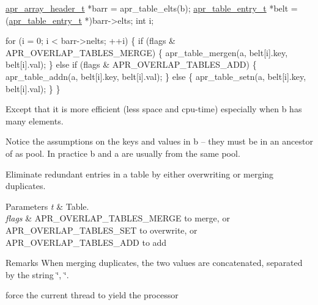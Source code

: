 \begin{DoxyPre}
 \hyperlink{structapr__array__header__t}{apr\_array\_header\_t} *barr = apr\_table\_elts(b);
 \hyperlink{structapr__table__entry__t}{apr\_table\_entry\_t} *belt = (\hyperlink{structapr__table__entry__t}{apr\_table\_entry\_t} *)barr->elts;
 int i;\end{DoxyPre}



\begin{DoxyPre} for (i = 0; i < barr->nelts; ++i) \{
     if (flags \& APR\_OVERLAP\_TABLES\_MERGE) \{
         apr\_table\_mergen(a, belt[i].key, belt[i].val);
     \}
     else if (flags \& APR\_OVERLAP\_TABLES\_ADD) \{
         apr\_table\_addn(a, belt[i].key, belt[i].val);
     \}
     else \{
         apr\_table\_setn(a, belt[i].key, belt[i].val);
     \}
 \}
\end{DoxyPre}


Except that it is more efficient (less space and cpu-\/time) especially when b has many elements.

Notice the assumptions on the keys and values in b -- they must be in an ancestor of a\textquotesingle{}s pool. In practice b and a are usually from the same pool.

Eliminate redundant entries in a table by either overwriting or merging duplicates.


\begin{DoxyParams}{Parameters}
{\em t} & Table. \\
\hline
{\em flags} & A\+P\+R\+\_\+\+O\+V\+E\+R\+L\+A\+P\+\_\+\+T\+A\+B\+L\+E\+S\+\_\+\+M\+E\+R\+GE to merge, or A\+P\+R\+\_\+\+O\+V\+E\+R\+L\+A\+P\+\_\+\+T\+A\+B\+L\+E\+S\+\_\+\+S\+ET to overwrite, or A\+P\+R\+\_\+\+O\+V\+E\+R\+L\+A\+P\+\_\+\+T\+A\+B\+L\+E\+S\+\_\+\+A\+DD to add \\
\hline
\end{DoxyParams}
\begin{DoxyRemark}{Remarks}
When merging duplicates, the two values are concatenated, separated by the string \char`\"{}, \char`\"{}.
\end{DoxyRemark}
force the current thread to yield the processor

